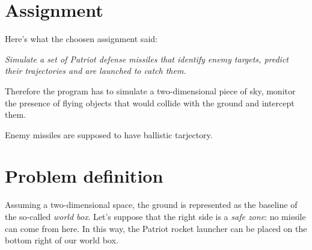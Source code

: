 \documentclass[notitlepage,a4paper,11pt]{article} %
\begin{document}

\section{Assignment}

	Here's what the choosen assignment said:
	\begin{displayquote}
	\emph{Simulate a set of Patriot defense missiles that identify enemy targets, predict their trajectories and are launched to catch them.}
	\end{displayquote}
	Therefore the program has to simulate a two-dimensional piece of sky, monitor the presence of flying objects that would collide with the ground and intercept them.

	Enemy missiles are supposed to have ballistic tarjectory.

\section{Problem definition}

	Assuming a two-dimensional space, the ground is represented as the baseline of the so-called \emph{world box}. Let's suppose that the right side is a \emph{safe zone}: no missile can come from here. In this way, the Patriot rocket launcher can be placed on the bottom right of our world box.
\end{document}
